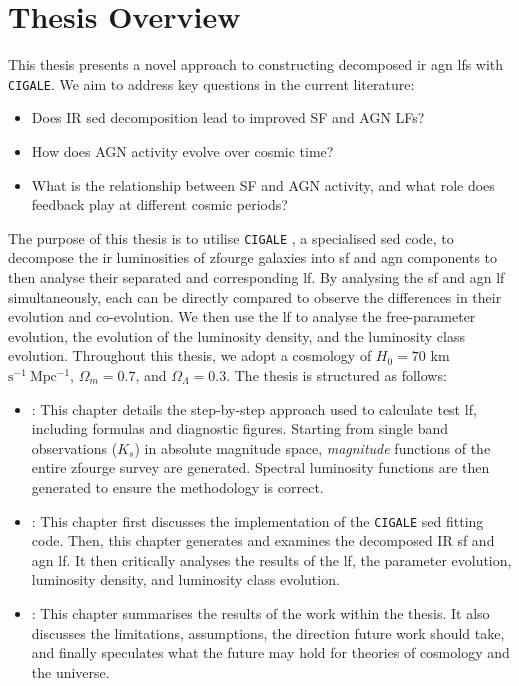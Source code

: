 \section{Thesis Overview}
 This thesis presents a novel approach to constructing decomposed \gls{ir} \gls{agn} \gls{lf}s with \texttt{CIGALE}. We aim to address key questions in the current literature:

\begin{itemize}
    \item Does IR \gls{sed} decomposition lead to improved SF and AGN LFs?
    \item How does AGN activity evolve over cosmic time?
    \item What is the relationship between SF and AGN activity, and what role does feedback play at different cosmic periods?
\end{itemize}

The purpose of this thesis is to utilise \texttt{CIGALE} \citep{boquien_cigale_2019}, a specialised \gls{sed} code, to decompose the \gls{ir} luminosities of \gls{zfourge} galaxies \citep{straatman_fourstar_2016} into \gls{sf} and \gls{agn} components to then analyse their separated and corresponding \gls{lf}. By analysing the \gls{sf} and \gls{agn} \gls{lf} simultaneously, each can be directly compared to observe the differences in their evolution and co-evolution. We then use the \gls{lf} to analyse the free-parameter evolution, the evolution of the luminosity density, and the luminosity class evolution. Throughout this thesis, we adopt a cosmology of $H_0 = 70$ km $\mathrm{s^{-1}\ Mpc^{-1}}$, $\Omega_m=0.7$, and $\Omega_\Lambda=0.3$. The thesis is structured as follows:

\begin{itemize}
    \item {}: This chapter details the step-by-step approach used to calculate test \gls{lf}, including formulas and diagnostic figures. Starting from single band observations ($K_s$) in absolute magnitude space, \textit{magnitude} functions of the entire \gls{zfourge} survey are generated. Spectral luminosity functions are then generated to ensure the methodology is correct.

    \item {}: This chapter first discusses the implementation of the \texttt{CIGALE} \gls{sed} fitting code. Then, this chapter generates and examines the decomposed IR \gls{sf} and \gls{agn} \gls{lf}. It then critically analyses the results of the \gls{lf}, the parameter evolution, luminosity density, and luminosity class evolution. 

    \item {}: This chapter summarises the results of the work within the thesis. It also discusses the limitations, assumptions, the direction future work should take, and finally speculates what the future may hold for theories of cosmology and the universe. 
\end{itemize}